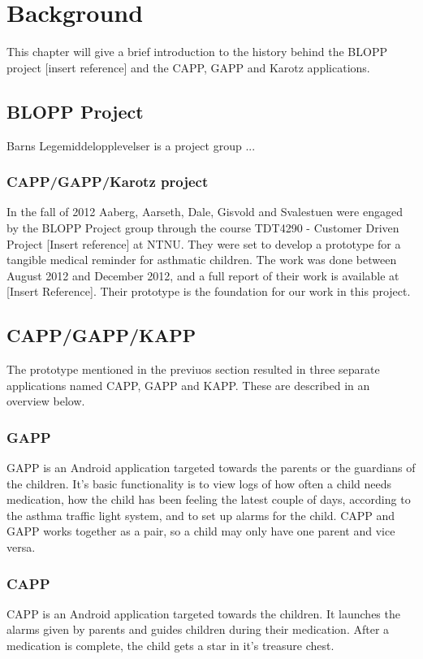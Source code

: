 \chapter{Background}
\label{background}


This chapter will give a brief introduction to the history behind the BLOPP project [insert reference] and the CAPP, GAPP and Karotz applications.


\section{BLOPP Project}
Barns Legemiddelopplevelser is a project group ...

\subsection{CAPP/GAPP/Karotz project}
In the fall of 2012 Aaberg, Aarseth, Dale, Gisvold and Svalestuen were engaged by the BLOPP Project group through the course TDT4290 - Customer Driven Project [Insert reference] at NTNU. They were set to develop a prototype for a tangible medical reminder for asthmatic children. The work was done between August 2012 and December 2012, and a full report of their work is available at [Insert Reference]. 
Their prototype is the foundation for our work in this project.


\section{CAPP/GAPP/KAPP}
The prototype mentioned in the previuos section resulted in three separate applications named CAPP, GAPP and KAPP. These are described in an overview below.  

\subsection{GAPP}
GAPP is an Android application targeted towards the parents or the guardians of the children. 
It's basic functionality is to view logs of how often a child needs medication, how the child has been feeling the latest couple of days, according to the asthma traffic light system, and to set up alarms for the child. 
CAPP and GAPP works together as a pair, so a child may only have one parent and vice versa. %


\subsection{CAPP}
CAPP is an Android application targeted towards the children. It launches the alarms given by parents and guides children during their medication. After a medication is complete, the child gets a star in it's treasure chest.    


